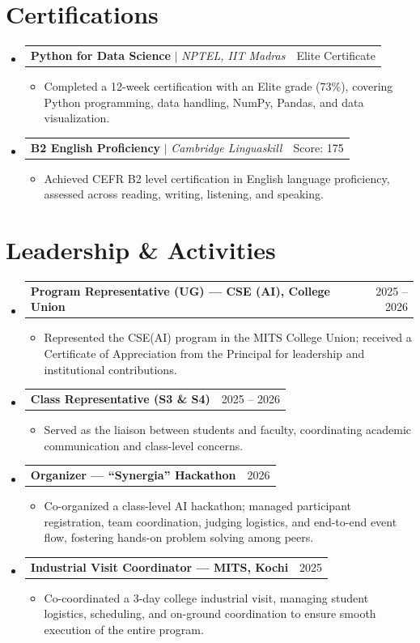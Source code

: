 \documentclass[a4paper,10pt]{article}
\makeatletter
\newcommand{\resumeItem}[1]{
  \item\small{
    {#1 \vspace{-2pt}}
  }
}
\newcommand{\resumeProjectHeading}[2]{
    \item
    \begin{tabular*}{0.97\textwidth}{l@{\extracolsep{\fill}}r}
      \small#1 & #2 \\
    \end{tabular*}\vspace{-7pt}
}
\newcommand{\resumeSubHeadingListStart}{\begin{itemize}[leftmargin=0.15in, label={}]}
\newcommand{\resumeSubHeadingListEnd}{\end{itemize}}
\newcommand{\resumeItemListStart}{\begin{itemize}}
\newcommand{\resumeItemListEnd}{\end{itemize}\vspace{-5pt}}
\makeatother
\begin{document}
\section{Certifications}
  \resumeSubHeadingListStart
    \resumeProjectHeading{\textbf{Python for Data Science} $|$ \emph{NPTEL, IIT Madras}}{Elite Certificate}
    \resumeItemListStart
      \resumeItem{Completed a 12-week certification with an Elite grade (73\%), covering Python programming, data handling, NumPy, Pandas, and data visualization.}
    \resumeItemListEnd
    \resumeProjectHeading{\textbf{B2 English Proficiency} $|$ \emph{Cambridge Linguaskill}}{Score: 175}
    \resumeItemListStart
      \resumeItem{Achieved CEFR B2 level certification in English language proficiency, assessed across reading, writing, listening, and speaking.}
    \resumeItemListEnd
  \resumeSubHeadingListEnd


\section{Leadership \& Activities}
  \resumeSubHeadingListStart
    \resumeProjectHeading{\textbf{Program Representative (UG) --- CSE (AI), College Union}}{2025 -- 2026}
    \resumeItemListStart
      \resumeItem{Represented the CSE(AI) program in the MITS College Union; received a Certificate of Appreciation from the Principal for leadership and institutional contributions.}
    \resumeItemListEnd
    \resumeProjectHeading{\textbf{Class Representative (S3 \& S4)}}{2025 -- 2026}
    \resumeItemListStart
      \resumeItem{Served as the liaison between students and faculty, coordinating academic communication and class-level concerns.}
    \resumeItemListEnd
    \resumeProjectHeading{\textbf{Organizer --- ``Synergia'' Hackathon}}{2026}
    \resumeItemListStart
      \resumeItem{Co-organized a class-level AI hackathon; managed participant registration, team coordination, judging logistics, and end-to-end event flow, fostering hands-on problem solving among peers.}
    \resumeItemListEnd
    \resumeProjectHeading{\textbf{Industrial Visit Coordinator --- MITS, Kochi}}{2025}
    \resumeItemListStart
      \resumeItem{Co-coordinated a 3-day college industrial visit, managing student logistics, scheduling, and on-ground coordination to ensure smooth execution of the entire program.}
    \resumeItemListEnd
  \resumeSubHeadingListEnd


\end{document}
